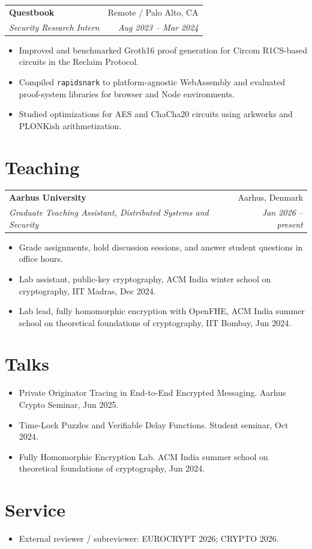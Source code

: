 \documentclass[10pt,a4paper]{article}
\makeatletter
\newcommand{\cvheading}[4]{%
  \begin{tabular*}{\textwidth}{@{\extracolsep{\fill}} l r}
    \textbf{#1} & #2 \\
    \emph{#3} & \emph{#4}
  \end{tabular*}
  \vspace{-0.35em}
}
\makeatother
\begin{document}
\cvheading{Questbook}{Remote / Palo Alto, CA}{Security Research Intern}{Aug 2023 -- Mar 2024}
\begin{itemize}
  \item Improved and benchmarked Groth16 proof generation for Circom R1CS-based circuits in the Reclaim Protocol.
  \item Compiled \texttt{rapidsnark} to platform-agnostic WebAssembly and evaluated proof-system libraries for browser and Node environments.
  \item Studied optimizations for AES and ChaCha20 circuits using arkworks and PLONKish arithmetization.
\end{itemize}

\section*{Teaching}
\cvheading{Aarhus University}{Aarhus, Denmark}{Graduate Teaching Assistant, Distributed Systems and Security}{Jan 2026 -- present}
\begin{itemize}
  \item Grade assignments, hold discussion sessions, and answer student questions in office hours.
\end{itemize}

\begin{itemize}
  \item Lab assistant, public-key cryptography, ACM India winter school on cryptography, IIT Madras, Dec 2024.
  \item Lab lead, fully homomorphic encryption with OpenFHE, ACM India summer school on theoretical foundations of cryptography, IIT Bombay, Jun 2024.
\end{itemize}

\section*{Talks}
\begin{itemize}
  \item Private Originator Tracing in End-to-End Encrypted Messaging. Aarhus Crypto Seminar, Jun 2025.
  \item Time-Lock Puzzles and Verifiable Delay Functions. Student seminar, Oct 2024.
  \item Fully Homomorphic Encryption Lab. ACM India summer school on theoretical foundations of cryptography, Jun 2024.
\end{itemize}

\section*{Service}
\begin{itemize}
  \item External reviewer / subreviewer: EUROCRYPT 2026; CRYPTO 2026.
\end{itemize}
\end{document}
